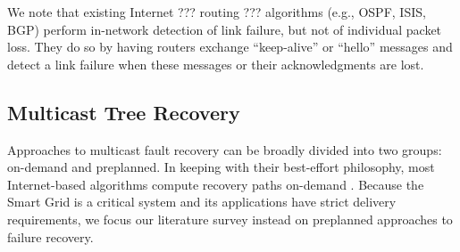 We note that existing Internet  ??? routing ??? algorithms (e.g., OSPF, ISIS, BGP) perform in-network detection of link failure, but not of individual packet loss. They do so by
having routers exchange ``keep-alive'' or ``hello'' messages and detect a link failure when these messages or their acknowledgments are lost.






\subsection{Multicast Tree Recovery}


Approaches to multicast fault recovery can be broadly divided into two groups: on-demand and preplanned. 
In keeping with their best-effort philosophy, most Internet-based algorithms compute recovery paths on-demand \cite{Cui04}. 
Because the Smart Grid is a critical system and its applications have strict delivery requirements, we focus our literature survey instead on preplanned approaches to failure recovery. 
 
